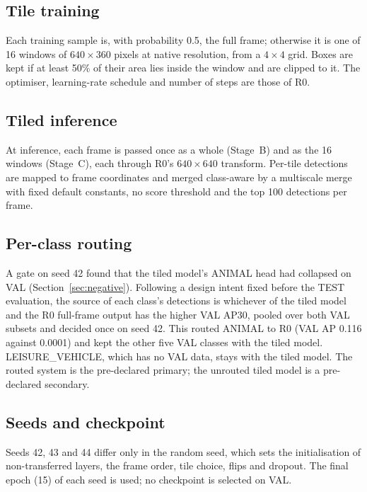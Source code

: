 \subsection{Tile training}
Each training sample is, with probability 0.5, the full frame; otherwise it is one of 16 windows of $640\times360$ pixels at native resolution, from a $4\times4$ grid. Boxes are kept if at least 50\% of their area lies inside the window and are clipped to it. The optimiser, learning-rate schedule and number of steps are those of R0.

\subsection{Tiled inference}
At inference, each frame is passed once as a whole (Stage~B) and as the 16 windows (Stage~C), each through R0's $640\times640$ transform. Per-tile detections are mapped to frame coordinates and merged class-aware by a multiscale merge with fixed default constants, no score threshold and the top 100 detections per frame.

\subsection{Per-class routing}
A gate on seed 42 found that the tiled model's ANIMAL head had collapsed on VAL (Section~\ref{sec:negative}). Following a design intent fixed before the TEST evaluation, the source of each class's detections is whichever of the tiled model and the R0 full-frame output has the higher VAL AP30, pooled over both VAL subsets and decided once on seed 42. This routed ANIMAL to R0 (VAL AP 0.116 against 0.0001) and kept the other five VAL classes with the tiled model. LEISURE\_VEHICLE, which has no VAL data, stays with the tiled model. The routed system is the pre-declared primary; the unrouted tiled model is a pre-declared secondary.

\subsection{Seeds and checkpoint}
Seeds 42, 43 and 44 differ only in the random seed, which sets the initialisation of non-transferred layers, the frame order, tile choice, flips and dropout. The final epoch (15) of each seed is used; no checkpoint is selected on VAL.
